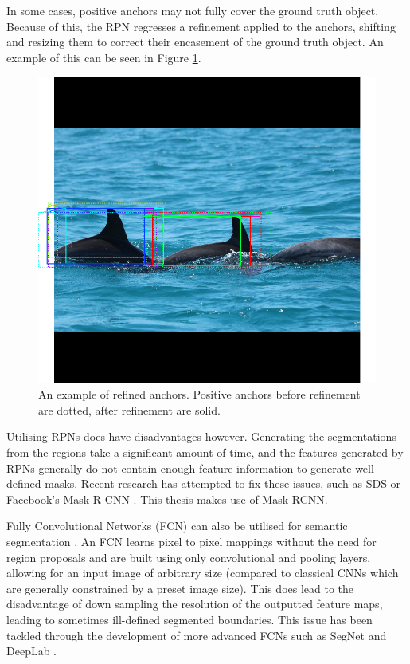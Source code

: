 In some cases, positive anchors may not fully cover the ground truth object. Because of this, the RPN regresses a refinement applied to the anchors, shifting and resizing them to correct their encasement of the ground truth object. An example of this can be seen in Figure \ref{fig:rpn-refined}.

\begin{figure}
	\begin{center}
		\includegraphics[scale=0.3]{Chapter2/figs/rpn-refined.png}
	\end{center}
	\caption{An example of refined anchors. Positive anchors before refinement are dotted, after refinement are solid.}
	\label{fig:rpn-refined}
\end{figure}

Utilising RPNs does have disadvantages however. Generating the segmentations from the regions take a significant amount of time, and the features generated by RPNs generally do not contain enough feature information to generate well defined masks. Recent research has attempted to fix these issues, such as SDS \cite{hariharan_simultaneous_2014} or Facebook's Mask R-CNN \cite{he_mask_2017}. This thesis makes use of Mask-RCNN.

Fully Convolutional Networks (FCN) can also be utilised for semantic segmentation \cite{long_fully_2014}. An FCN learns pixel to pixel mappings without the need for region proposals and are built using only convolutional and pooling layers, allowing for an input image of arbitrary size (compared to classical CNNs which are generally constrained by a preset image size). This does lead to the disadvantage of down sampling the resolution of the outputted feature maps, leading to sometimes ill-defined segmented boundaries. This issue has been tackled through the development of more advanced FCNs such as SegNet \cite{badrinarayanan_segnet:_2015} and DeepLab \cite{chen_semantic_2014}. 

